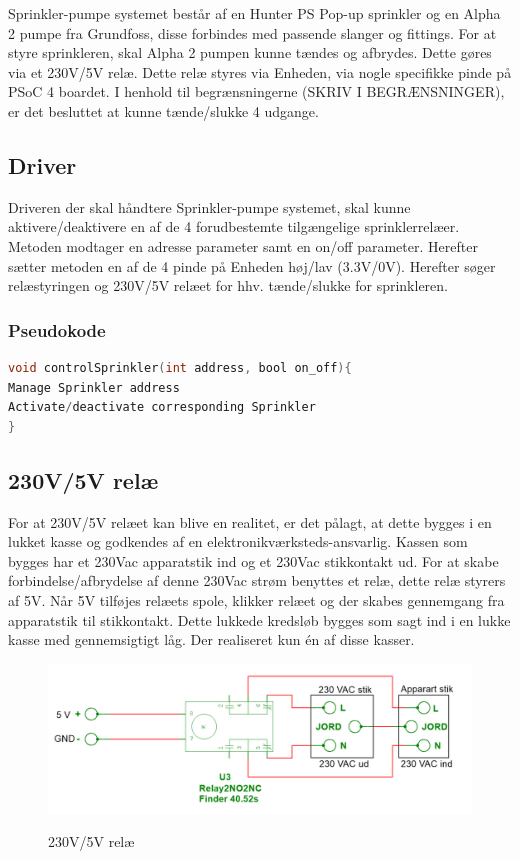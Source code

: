 Sprinkler-pumpe systemet består af en Hunter PS Pop-up sprinkler og en Alpha 2 pumpe fra Grundfoss, disse forbindes med passende slanger og fittings. For at styre sprinkleren, skal Alpha 2 pumpen kunne tændes og afbrydes. Dette gøres via et 230V/5V relæ. Dette relæ styres via Enheden, via nogle specifikke pinde på PSoC 4 boardet. I henhold til begrænsningerne (SKRIV I BEGRÆNSNINGER), er det besluttet at kunne tænde/slukke 4 udgange.

\subsection{Driver}

Driveren der skal håndtere Sprinkler-pumpe systemet, skal kunne aktivere/deaktivere en af de 4 forudbestemte tilgængelige sprinklerrelæer. Metoden modtager en adresse parameter samt en on/off parameter. Herefter sætter metoden en af de 4 pinde på Enheden høj/lav (3.3V/0V). Herefter søger relæstyringen og 230V/5V relæet for hhv. tænde/slukke for sprinkleren. 


\subsubsection*{Pseudokode}

\begin{lstlisting}[language=C]
void controlSprinkler(int address, bool on_off){
Manage Sprinkler address
Activate/deactivate corresponding Sprinkler
}
\end{lstlisting}



\subsection{230V/5V relæ}

For at 230V/5V relæet kan blive en realitet, er det pålagt, at dette bygges i en lukket kasse og godkendes af en elektronikværksteds-ansvarlig. Kassen som bygges har et 230Vac apparatstik ind og et 230Vac stikkontakt ud. For at skabe forbindelse/afbrydelse af denne 230Vac strøm benyttes et relæ, dette relæ styrers af 5V. Når 5V  tilføjes relæets spole, klikker relæet og der skabes gennemgang fra apparatstik til stikkontakt. Dette lukkede kredsløb bygges som sagt ind i en lukke kasse med gennemsigtigt låg. Der realiseret kun én af disse kasser.

\begin{figure}[H] \centering
{\includegraphics[width=\textwidth]{filer/design/Billeder/230VAC_KREDS}}
\caption{230V/5V relæ}
\label{lab:RELAY}
\raggedright
\end{figure}

